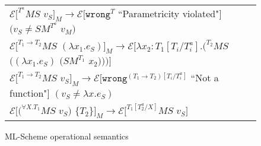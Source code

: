 \begin{figure}[p]
\begin{tabular}{l}
$\mathscr{E}[^{T^{a}}MS$ $v_{S}]_{M}\rightarrow\mathscr{E}[\mathtt{wrong}^{T}$ ``Parametricity violated"$]$ $(v_{S}\neq SM^{T^{a}}$ $v_{M})$ \\

\vspace{5pt}

$\mathscr{E}[^{T_{1}\rightarrow T_{2}}MS$ $(\lambda x_{1}.e_{S})]_{M}\rightarrow\mathscr{E}[\lambda x_{2}:T_{1}[T_{i}/T^{a}_{i}].(^{T_{2}}MS$ $((\lambda x_{1}.e_{S})$ $(SM^{T_{1}}$ $x_{2})))]$ \\

\vspace{5pt}

$\mathscr{E}[^{T_{1}\rightarrow T_{2}}MS$ $v_{S}]_{M}\rightarrow\mathscr{E}[\mathtt{wrong}^{(T_{1}\rightarrow T_{2})[T_{i}/T_{i}^{a}]}$ ``Not a function"$]$ $(v_{S}\neq\lambda x.e_{S})$ \\

\vspace{5pt}

$\mathscr{E}[(^{\forall X.T_{1}}MS$ $v_{S})$ $\lbrace T_{2}\rbrace]_{M}\rightarrow\mathscr{E}[^{T_{1}[T^{a}_{2}/X]}MS$ $v_{S}]$
\end{tabular}
\caption{ML-Scheme operational semantics}
\label{msos}
\end{figure}
